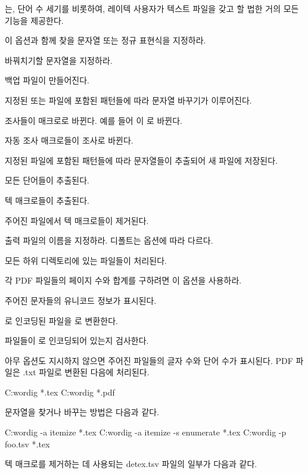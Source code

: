 는, 단어 수 세기를 비롯하여, 레이텍 사용자가 텍스트 파일을 갖고 할 법한 거의 모든 기능을 제공한다.

\begin{macros}
\item[-a] 이 옵션과 함께 찾을 문자열 또는 정규 표현식을 지정하라.
\item[-s] 바꿔치기할 문자열을 지정하라.
\item[-b] 백업 파일이 만들어진다.
\item[-P] 지정된  또는  파일에 포함된 패턴들에 따라 문자열 바꾸기가 이루어진다.
\item[-J] 조사들이  매크로로 바뀐다. 예를 들어 이 \macro*{\을}로 바뀐다.
\item[-j] 자동 조사 매크로들이 조사로 바뀐다.
\item[-e] 지정된 파일에 포함된 패턴들에 따라 문자열들이 추출되어 새 파일에 저장된다.
\item[-w] 모든 단어들이 추출된다.
\item[-t] 텍 매크로들이 추출된다.
\item[-d] 주어진 파일에서 텍 매크로들이 제거된다.
\item[-o] 출력 파일의 이름을 지정하라. 디폴트는 옵션에 따라 다르다.
\item[-r] 모든 하위 디렉토리에 있는 파일들이 처리된다.
\item[-P] 각 PDF 파일들의 페이지 수와 합계를 구하려면 이 옵션을 사용하라.
\item[-U] 주어진 문자들의 유니코드 정보가 표시된다.
\item[-C] 로 인코딩된 파일을 로 변환한다.
\item[-D] 파일들이 로 인코딩되어 있는지 검사한다.
\end{macros}

아무 옵션도 지시하지 않으면 주어진 파일들의 글자 수와 단어 수가 표시된다.
PDF 파일은 .txt 파일로 변환된 다음에 처리된다.

\begin{code}
C:\>wordig *.tex
C:\>wordig *.pdf
\end{code}

문자열을 찾거나 바꾸는 방법은 다음과 같다.

\begin{code}
C:\>wordig -a itemize *.tex
C:\>wordig -a itemize -s enumerate *.tex
C:\>wordig -p foo.tsv *.tex
\end{code}

텍 매크로를 제거하는 데 사용되는 detex.tsv 파일의 일부가 다음과 같다.

